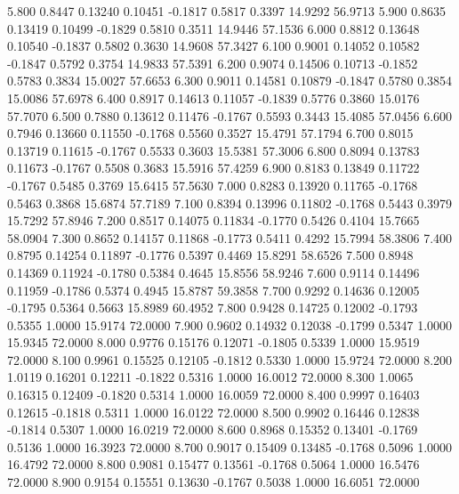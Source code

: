    5.800   0.8447   0.13240   0.10451  -0.1817   0.5817   0.3397  14.9292  56.9713
   5.900   0.8635   0.13419   0.10499  -0.1829   0.5810   0.3511  14.9446  57.1536
   6.000   0.8812   0.13648   0.10540  -0.1837   0.5802   0.3630  14.9608  57.3427
   6.100   0.9001   0.14052   0.10582  -0.1847   0.5792   0.3754  14.9833  57.5391
   6.200   0.9074   0.14506   0.10713  -0.1852   0.5783   0.3834  15.0027  57.6653
   6.300   0.9011   0.14581   0.10879  -0.1847   0.5780   0.3854  15.0086  57.6978
   6.400   0.8917   0.14613   0.11057  -0.1839   0.5776   0.3860  15.0176  57.7070
   6.500   0.7880   0.13612   0.11476  -0.1767   0.5593   0.3443  15.4085  57.0456
   6.600   0.7946   0.13660   0.11550  -0.1768   0.5560   0.3527  15.4791  57.1794
   6.700   0.8015   0.13719   0.11615  -0.1767   0.5533   0.3603  15.5381  57.3006
   6.800   0.8094   0.13783   0.11673  -0.1767   0.5508   0.3683  15.5916  57.4259
   6.900   0.8183   0.13849   0.11722  -0.1767   0.5485   0.3769  15.6415  57.5630
   7.000   0.8283   0.13920   0.11765  -0.1768   0.5463   0.3868  15.6874  57.7189
   7.100   0.8394   0.13996   0.11802  -0.1768   0.5443   0.3979  15.7292  57.8946
   7.200   0.8517   0.14075   0.11834  -0.1770   0.5426   0.4104  15.7665  58.0904
   7.300   0.8652   0.14157   0.11868  -0.1773   0.5411   0.4292  15.7994  58.3806
   7.400   0.8795   0.14254   0.11897  -0.1776   0.5397   0.4469  15.8291  58.6526
   7.500   0.8948   0.14369   0.11924  -0.1780   0.5384   0.4645  15.8556  58.9246
   7.600   0.9114   0.14496   0.11959  -0.1786   0.5374   0.4945  15.8787  59.3858
   7.700   0.9292   0.14636   0.12005  -0.1795   0.5364   0.5663  15.8989  60.4952
   7.800   0.9428   0.14725   0.12002  -0.1793   0.5355   1.0000  15.9174  72.0000
   7.900   0.9602   0.14932   0.12038  -0.1799   0.5347   1.0000  15.9345  72.0000
   8.000   0.9776   0.15176   0.12071  -0.1805   0.5339   1.0000  15.9519  72.0000
   8.100   0.9961   0.15525   0.12105  -0.1812   0.5330   1.0000  15.9724  72.0000
   8.200   1.0119   0.16201   0.12211  -0.1822   0.5316   1.0000  16.0012  72.0000
   8.300   1.0065   0.16315   0.12409  -0.1820   0.5314   1.0000  16.0059  72.0000
   8.400   0.9997   0.16403   0.12615  -0.1818   0.5311   1.0000  16.0122  72.0000
   8.500   0.9902   0.16446   0.12838  -0.1814   0.5307   1.0000  16.0219  72.0000
   8.600   0.8968   0.15352   0.13401  -0.1769   0.5136   1.0000  16.3923  72.0000
   8.700   0.9017   0.15409   0.13485  -0.1768   0.5096   1.0000  16.4792  72.0000
   8.800   0.9081   0.15477   0.13561  -0.1768   0.5064   1.0000  16.5476  72.0000
   8.900   0.9154   0.15551   0.13630  -0.1767   0.5038   1.0000  16.6051  72.0000
